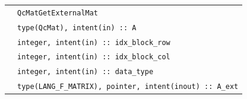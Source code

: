 \documentclass[a4paper,11pt,twoside,openright]{book}
\begin{document}
\begin{center}
\begin{longtable}{p{}|l}
    \cline{2-2}
    & \verb|QcMatGetExternalMat|\\
    & \hspace*{2ex}\verb|type(QcMat), intent(in) :: A|\\
    & \hspace*{2ex}\verb|integer, intent(in) :: idx_block_row|\\
    & \hspace*{2ex}\verb|integer, intent(in) :: idx_block_col|\\
    & \hspace*{2ex}\verb|integer, intent(in) :: data_type|\\
    & \hspace*{2ex}\verb|type(LANG_F_MATRIX), pointer, intent(inout) :: A_ext|
  \end{longtable}
\end{center}
\vspace*{-5ex}
\end{document}
